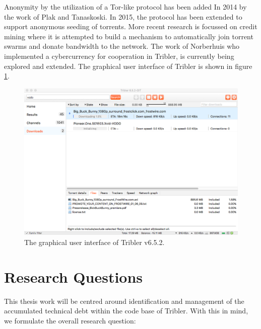 \noindent Anonymity by the utilization of a Tor-like protocol has been added In 2014 by the work of Plak\cite{plak2014anonymous} and Tanaskoski\cite{tanaskoski2014anonymous}. 
In 2015, the protocol has been extended to support anonymous seeding of torrents\cite{ruigrok2015bittorrent}.
More recent research is focussed on credit mining where it is attempted to build a mechanism to automatically join torrent swarms and donate bandwidth to the network. The work of Norberhuis\cite{norberhuis2015multichain} who implemented a cybercurrency for cooperation in Tribler, is currently being explored and extended.
The graphical user interface of Tribler is shown in figure \ref{fig:tribler-interface}.\\

\begin{figure}[h!]
	\centering
	\includegraphics[width=1.0\columnwidth]{images/introduction/tribler_interface}
	\caption{The graphical user interface of Tribler v6.5.2.}
	\label{fig:tribler-interface}
\end{figure}

\section{Research Questions}
This thesis work will be centred around identification and management of the accumulated technical debt within the code base of Tribler. With this in mind, we formulate the overall research question:\\

\noindent{}\\

